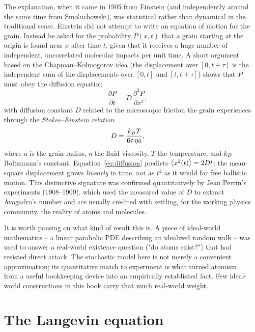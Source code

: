 The explanation, when it came in 1905 from Einstein (and independently
around the same time from Smoluchowski), was statistical rather than
dynamical in the traditional sense. Einstein did not attempt to write an
equation of motion for the grain. Instead he asked for the probability
$P(x,t)$ that a grain starting at the origin is found near $x$ after time
$t$, given that it receives a huge number of independent, uncorrelated
molecular impacts per unit time. A short argument based on the
Chapman--Kolmogorov idea (the displacement over $[0,t+\tau]$ is the
independent sum of the displacements over $[0,t]$ and $[t,t+\tau]$) shows
that $P$ must obey the diffusion equation
\begin{equation}
\frac{\partial P}{\partial t} = D\,\frac{\partial^2 P}{\partial x^2},
\label{eq:diffusion}
\end{equation}
with diffusion constant $D$ related to the microscopic friction the grain
experiences through the \emph{Stokes--Einstein relation}
\begin{equation}
D = \frac{k_{B} T}{6\pi \eta a},
\label{eq:stokes-einstein}
\end{equation}
where $a$ is the grain radius, $\eta$ the fluid viscosity, $T$ the
temperature, and $k_{B}$ Boltzmann's constant. Equation~\eqref{eq:diffusion}
predicts $\left\langle x^2(t) \right\rangle = 2Dt$: the mean-square displacement grows
\emph{linearly} in time, not as $t^2$ as it would for free ballistic
motion. This distinctive signature was confirmed quantitatively by Jean
Perrin's experiments (1908--1909), which used the measured value of $D$ to
extract Avogadro's number and are usually credited with settling, for the
working physics community, the reality of atoms and molecules.

\begin{remark}
It is worth pausing on what kind of result this is. A piece of
ideal-world mathematics -- a linear parabolic PDE describing an idealized
random walk -- was used to answer a real-world existence question ("do
atoms exist?") that had resisted direct attack. The stochastic model here
is not merely a convenient approximation; its quantitative match to
experiment is what turned atomism from a useful bookkeeping device into
an empirically established fact. Few ideal-world constructions in this
book carry that much real-world weight.
\end{remark}

\section{The Langevin equation}
\label{sec:langevin}

